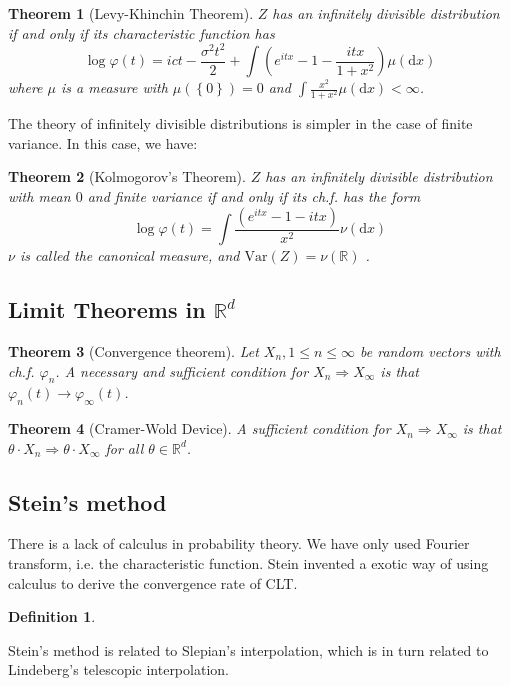 \documentclass{article}
\newtheorem{Thm}{Theorem}[section]
\theoremstyle{definition}
\newtheorem{Def}{Definition}[section]
\begin{document}
\begin{Thm}[Levy-Khinchin Theorem]
    $Z$ has an infinitely divisible distribution if and only if its characteristic function has
    \[\log \varphi(t)=ict-\frac{\sigma^2t^2}{2}+\int(e^{itx}-1-\frac{itx}{1+x^2})\mu(\mathrm{d}x)\] 
    where $\mu$ is a measure with $\mu(\left\{0\right\})=0$ and $\int\frac{x^2}{1+x^2}\mu(\mathrm{d}x)<\infty$.
\end{Thm}
The theory of infinitely divisible distributions is simpler in the case of finite variance. In this case, we have:
\begin{Thm}[Kolmogorov's Theorem]
    $Z$ has an infinitely divisible distribution with mean $0$ and finite variance if and only if its ch.f. has the form
    \[\log\varphi(t)=\int \frac{(e^{itx}-1-itx)}{x^2}\nu(\mathrm{d}x)\]
    $\nu$ is called the canonical measure, and $\text{Var}(Z)=\nu(\mathbb{R})$ .
\end{Thm}

\subsection{Limit Theorems in $\mathbb{R}^d$}
\begin{Thm}[Convergence theorem]
    Let $X_n,1\le n\le\infty$ be random vectors with ch.f. $\varphi_n$. A necessary and sufficient condition for $X_n\Longrightarrow X_\infty$ is that $\varphi_n(t)\to\varphi_\infty(t)$.
\end{Thm}


\begin{Thm}[Cramer-Wold Device]
    A sufficient condition for $X_n\Longrightarrow X_\infty$ is that $\theta\cdot X_n\Longrightarrow \theta\cdot X_\infty$ for all $\theta\in\mathbb{R}^d$.
\end{Thm}


\subsection{Stein's method}
There is a lack of calculus in probability theory. We have only used Fourier transform, i.e. the characteristic function.
Stein invented a exotic way of using calculus to derive the convergence rate of CLT.
\begin{Def}
    
\end{Def}


Stein's method is related to Slepian's interpolation, which is in turn related to Lindeberg's telescopic interpolation.
\end{document}

